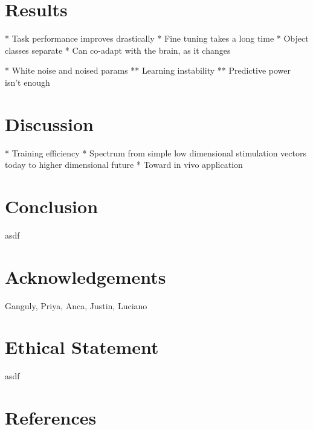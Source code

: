 \documentclass[12pt]{iopart}
\begin{document}
\section{Results}

* Task performance improves drastically
* Fine tuning takes a long time
* Object classes separate
* Can co-adapt with the brain, as it changes

* White noise and noised params
** Learning instability
** Predictive power isn't enough

\section{Discussion}
* Training efficiency
* Spectrum from simple low dimensional stimulation vectors today to higher dimensional future
* Toward in vivo application

\section{Conclusion}
asdf

\section{Acknowledgements}
Ganguly, Priya, Anca, Justin, Luciano

\section{Ethical Statement}
asdf

\section{References}


\end{document}
